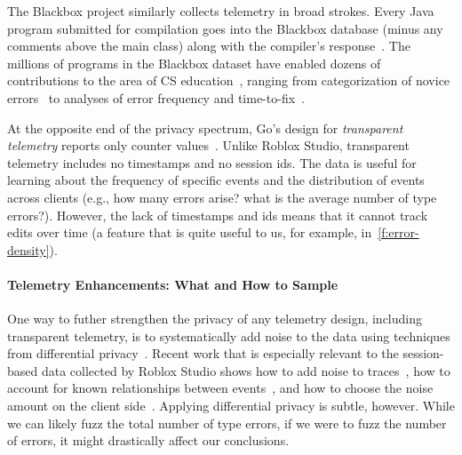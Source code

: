 \documentclass[english,submission,cleveref]{programming}
\begin{document}
The Blackbox project similarly collects telemetry in broad strokes.
Every Java program submitted for compilation goes into the Blackbox database (minus
any comments above the main class) along with the compiler's response~\cite{bkmu-sigcse-2014}.
The millions of programs in the Blackbox dataset
have enabled dozens of contributions to the area of CS
education~\cite{bask-icer-2018}, ranging from categorization of novice
errors~\cite{mk-fie-2014,m-masters-2016} to analyses of error frequency and
time-to-fix~\cite{ab-sigcse-2015}.

At the opposite end of the privacy spectrum, Go's design for \emph{transparent
telemetry} reports only counter values~\cite{transparent-telemetry}.
Unlike Roblox Studio, transparent telemetry includes no timestamps and no 
session ids.
The data is useful for learning about the frequency of specific events and the
distribution of events across clients (e.g., how many 
errors arise? what is the average number of type errors?).
However, the lack of timestamps and ids means that it cannot track edits
over time (a feature that is quite useful to us, for example, in~\cref{f:error-density}).


\paragraph{Telemetry Enhancements: What and How to Sample}

One way to futher strengthen the privacy of any telemetry design, including
transparent telemetry, is to systematically add noise to the data using
techniques from differential
privacy~\cite{zhlbr-cc-2020,epk-ccs-2014,wblj-usenix-2017}.
Recent work that is especially relevant to the session-based data collected
by Roblox Studio shows how to add noise to traces~\cite{zhlbr-cc-2020},
how to account for known relationships between events~\cite{zhlbr-oopsla-2020},
and how to choose the noise amount on the client side~\cite{hlzbr-ecoop-2021}.
Applying differential privacy is subtle, however.
While we can likely fuzz the total number of type errors, if we were to
fuzz the number of  errors, it might drastically
affect our conclusions.
\end{document}
